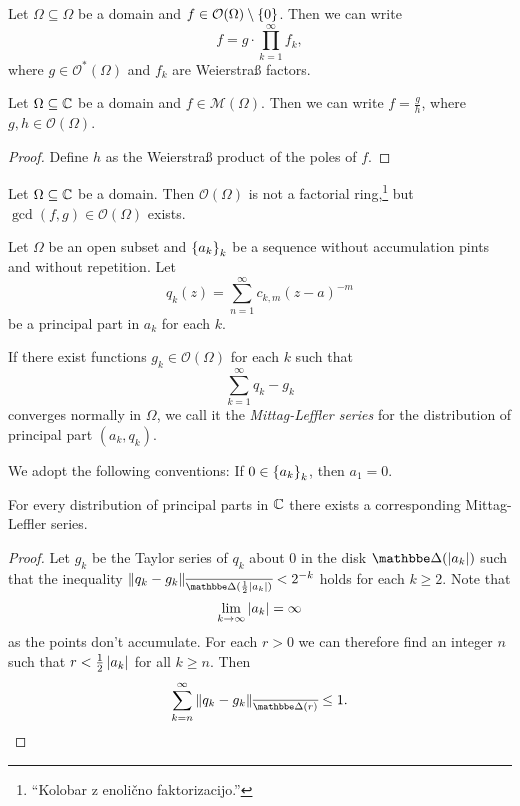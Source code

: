 \begin{izrek}
Let $\Omega \subseteq \Omega$ be a domain and
$f \in \mathcal{O}(\Omega) \setminus \left\{0\right\}$. Then we can write
\[
f = g \cdot \prod_{k=1}^\infty f_k,
\]
where $g \in \mathcal{O}^*(\Omega)$ and $f_k$ are Weierstraß
factors.
\end{izrek}

\obvs

\begin{izrek}
Let $\Omega \subseteq \mathbb{C}$ be a domain and
$f \in \mathcal{M}(\Omega)$. Then we can write $f = \frac{g}{h}$,
where $g, h \in \mathcal{O}(\Omega)$.
\end{izrek}

\begin{proof}
Define $h$ as the Weierstraß product of the poles of $f$.
\end{proof}

\begin{opomba}
Let $\Omega \subseteq \mathbb{C}$ be a domain. Then $\mathcal{O}(\Omega)$
is not a factorial ring,\footnote{``Kolobar z enolično
faktorizacijo.''} but $\gcd(f, g) \in \mathcal{O}(\Omega)$ exists.
\end{opomba}


\begin{definicija}
Let $\Omega$ be an open subset and $\left\{a_k\right\}_k$ be a sequence
without accumulation pints and without repetition. Let
\[
q_k(z) = \sum_{n=1}^\infty c_{k, m} (z - a)^{-m}
\]
be a principal part in $a_k$ for each $k$.

If there exist functions $g_k \in \mathcal{O}(\Omega)$ for each $k$
such that
\[
\sum_{k=1}^\infty q_k - g_k
\]
converges normally in $\Omega$, we call it the
\emph{Mittag-Leffler series} for the
distribution of principal part $(a_k, q_k)$.
\end{definicija}

\begin{opomba}
We adopt the following conventions: If $0 \in \left\{a_k\right\}_k$, then
$a_1 = 0$.
\end{opomba}

\begin{izrek}
\label{inf_prod:thm:MLforC}
For every distribution of principal parts in $\mathbb{C}$ there exists a
corresponding Mittag-Leffler series.
\end{izrek}

\begin{proof}
Let $g_k$ be the Taylor series of $q_k$ about $0$ in the disk
$\dsk(\abs{a_k})$ such that the inequality
$\norm{q_k - g_k}_{\oline{\dsk(\frac{1}{2} \abs{a_k})}} < 2^{-k}$ holds for each $k \geq 2$. Note that
\[
\lim_{k \to \infty} \left\lvert a_k\right\rvert = \infty
\]
as the points don't accumulate. For each $r > 0$ we can therefore
find an integer $n$ such that $r < \frac{1}{2} \left\lvert a_k\right\rvert$ for all
$k \geq n$. Then
\[
\sum_{k = n}^{\infty} \norm{q_k - g_k}_{\oline{\dsk(r)}} \leq 1.
\qedhere
\]
\end{proof}

